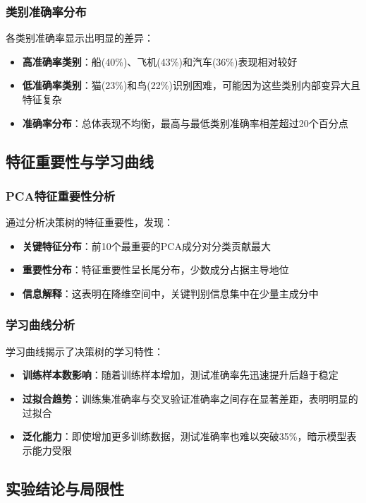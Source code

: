 \documentclass[UTF8]{report}
\theoremstyle{MyLineTheoremStyle} %
\theoremstyle{MyBlockTheoremStyle} %
\theoremstyle{MySubsubsectionStyle} %
\begin{document}
\subsubsection{类别准确率分布}
各类别准确率显示出明显的差异：
\begin{itemize}
    \item \textbf{高准确率类别}：船(40\%)、飞机(43\%)和汽车(36\%)表现相对较好
    \item \textbf{低准确率类别}：猫(23\%)和鸟(22\%)识别困难，可能因为这些类别内部变异大且特征复杂
    \item \textbf{准确率分布}：总体表现不均衡，最高与最低类别准确率相差超过20个百分点
\end{itemize}

\subsection{特征重要性与学习曲线}

\subsubsection{PCA特征重要性分析}
通过分析决策树的特征重要性，发现：
\begin{itemize}
    \item \textbf{关键特征分布}：前10个最重要的PCA成分对分类贡献最大
    \item \textbf{重要性分布}：特征重要性呈长尾分布，少数成分占据主导地位
    \item \textbf{信息解释}：这表明在降维空间中，关键判别信息集中在少量主成分中
\end{itemize}

\subsubsection{学习曲线分析}
学习曲线揭示了决策树的学习特性：
\begin{itemize}
    \item \textbf{训练样本数影响}：随着训练样本增加，测试准确率先迅速提升后趋于稳定
    \item \textbf{过拟合趋势}：训练集准确率与交叉验证准确率之间存在显著差距，表明明显的过拟合
    \item \textbf{泛化能力}：即使增加更多训练数据，测试准确率也难以突破35\%，暗示模型表示能力受限
\end{itemize}

\subsection{实验结论与局限性}
\end{document}
